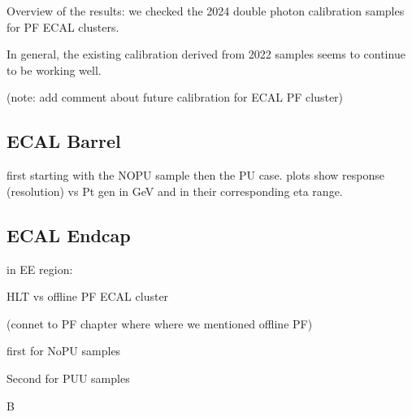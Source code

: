 Overview of the results: we checked the 2024 double photon calibration samples for PF ECAL clusters.

In general, the existing calibration derived from 2022 samples seems to continue to be working well.


(note: add comment about future calibration for ECAL PF cluster)

\subsection{ECAL Barrel}
first starting with the NOPU sample then the PU case.
plots show response (resolution) vs Pt gen in GeV and in their corresponding eta range.





\subsection{ECAL Endcap}
in EE region:





HLT vs offline PF ECAL cluster

(connet to PF chapter where where we mentioned offline PF)

first for NoPU samples

Second for PUU samples

B
